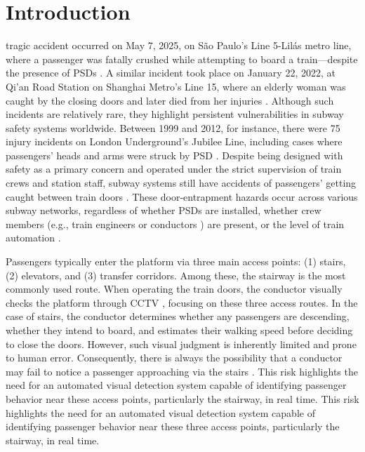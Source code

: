 \documentclass[journal,twoside,web]{ieeecolor}
\begin{document}
\section{Introduction}
\label{sec:introduction}
tragic accident occurred on May 7, 2025, on São Paulo’s Line 5-Lilás metro line, where a passenger was fatally crushed while attempting to board a train—despite the presence of \acp{PSD} \cite{francisco_lima_neto_passenger_2025}. A similar incident took place on January 22, 2022, at Qi’an Road Station on Shanghai Metro’s Line 15, where an elderly woman was caught by the closing doors and later died from her injuries \cite{Wenting2022Shanghai}. Although such incidents are relatively rare, they highlight persistent vulnerabilities in subway safety systems worldwide. Between 1999 and 2012, for instance, there were 75 injury incidents on London Underground’s Jubilee Line, including cases where passengers' heads and arms were struck by PSD  \cite{Hill2012FOI}. Despite being designed with safety as a primary concern and operated under the strict supervision of train crews and station staff, subway systems still have accidents of passengers' getting caught between train doors \cite{Ahmed2024Guardian, RAIB2024Enfield, RAIB2018Bushey, RAIB2022WoodStreet}. These door-entrapment hazards occur across various subway networks, regardless of whether \acp{PSD} are installed, whether crew members (e.g., train engineers or conductors \cite{swerdlow_underground_1998}) are present, or the level of train automation \cite{RAIB2024Enfield, Kim2024Sillim}.

Passengers typically enter the platform via three main access points: (1) stairs, (2) elevators, and (3) transfer corridors. Among these, the stairway is the most commonly used route. When operating the train doors, the conductor visually checks the platform through \ac{CCTV} \cite{swerdlow_underground_1998}, focusing on these three access routes. In the case of stairs, the conductor determines whether any passengers are descending, whether they intend to board, and estimates their walking speed before deciding to close the doors. However, such visual judgment is inherently limited and prone to human error. Consequently, there is always the possibility that a conductor may fail to notice a passenger approaching via the stairs \cite{RAIB2024Enfield, bayliss2025passenger}. 
This risk highlights the need for an automated visual detection system capable of identifying passenger behavior near these access points, particularly the stairway, in real time.
This risk highlights the need for an automated visual detection system capable of identifying passenger behavior near these three access points, particularly the stairway, in real time.
\end{document}
